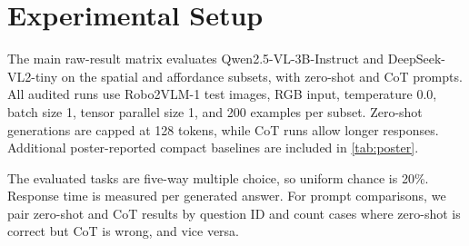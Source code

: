 \section{Experimental Setup}
\label{sec:setup}

The main raw-result matrix evaluates Qwen2.5-VL-3B-Instruct and DeepSeek-VL2-tiny on the spatial and affordance subsets, with zero-shot and CoT prompts. All audited runs use Robo2VLM-1 test images, RGB input, temperature 0.0, batch size 1, tensor parallel size 1, and 200 examples per subset. Zero-shot generations are capped at 128 tokens, while CoT runs allow longer responses. Additional poster-reported compact baselines are included in \cref{tab:poster}.

The evaluated tasks are five-way multiple choice, so uniform chance is 20\%. Response time is measured per generated answer. For prompt comparisons, we pair zero-shot and CoT results by question ID and count cases where zero-shot is correct but CoT is wrong, and vice versa.
